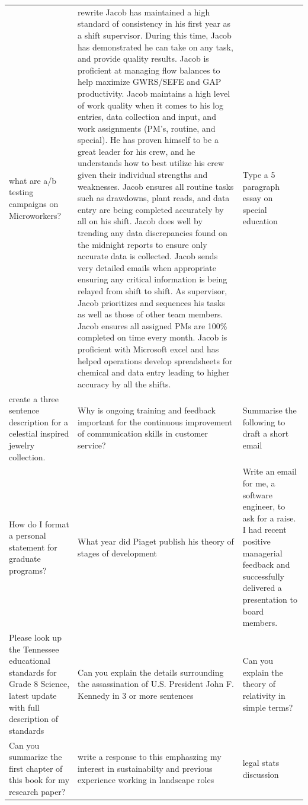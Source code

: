 \begin{table}[ht]
\begin{tabular}{p{4.3cm}p{4.3cm}p{4.3cm}}
what are a/b testing campaigns on Microworkers? & rewrite Jacob has maintained a high standard of consistency in his first year as a shift supervisor. During this time, Jacob has demonstrated he can take on any task, and provide quality results. Jacob is proficient at managing flow balances to help maximize GWRS/SEFE and GAP productivity. Jacob maintains a high level of work quality when it comes to his log entries, data collection and input, and work assignments (PM's, routine, and special). He has proven himself to be a great leader for his crew, and he understands how to best utilize his crew given their individual strengths and weaknesses.  Jacob ensures all routine tasks such as drawdowns, plant reads, and data entry are being completed accurately by all on his shift. Jacob does well by trending any data discrepancies found on the midnight reports to ensure only accurate data is collected. Jacob sends very detailed emails when appropriate ensuring any critical information is being relayed from shift to shift.  As supervisor, Jacob prioritizes and sequences his tasks as well as those of other team members. Jacob ensures all assigned PMs are 100\% completed on time every month. Jacob is proficient with Microsoft excel and has helped operations develop spreadsheets for chemical and data entry leading to higher accuracy by all the shifts. & Type a 5 paragraph essay on special education \\[4pt]
create a three sentence description for a celestial inspired jewelry collection. & Why is ongoing training and feedback important for the continuous improvement of communication skills in customer service? & Summarise the following to draft a short email \\[4pt]
How do I format a personal statement for graduate programs? & What year did Piaget publish his theory of stages of development & Write an email for me, a software engineer, to ask for a raise. I had recent positive managerial feedback and successfully delivered a presentation to board members. \\[4pt]
Please look up the Tennessee educational standards for Grade 8 Science, latest update with full description of standards & Can you explain the details surrounding the assassination of U.S. President John F. Kennedy in 3 or more sentences & Can you explain the theory of relativity in simple terms? \\[4pt]
Can you summarize the first chapter of this book for my research paper? & write a response to this emphaszing my interest in sustainabilty and previous experience working in landscape roles & legal stats discussion \\[4pt]

\end{tabular}
\end{table}
